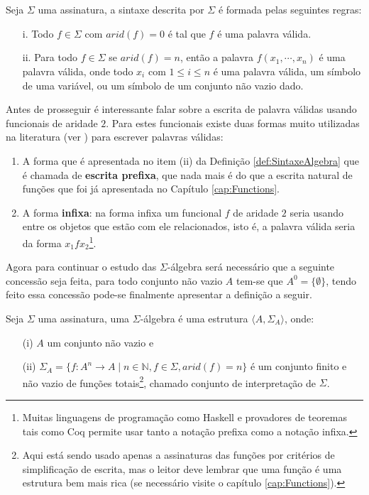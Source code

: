 \

\

\begin{definicao}\label{def:SintaxeAlgebra}
  Seja $\Sigma$ uma assinatura, a sintaxe descrita por $\Sigma$ é formada pelas seguintes regras: 
  \begin{itemize}
    \item[i.] Todo $f \in \Sigma$ com $arid(f) = 0$ é tal que $f$ é uma palavra válida.
    \item[ii.] Para todo $f \in \Sigma$ se $arid(f) = n$, então a palavra $f(x_1, \cdots, x_n)$ é uma palavra válida, onde todo $x_i$ com $1 \leq i \leq n$ é uma palavra válida, um símbolo de uma variável, ou um símbolo de um conjunto não vazio dado.
  \end{itemize}
\end{definicao}

Antes de prosseguir é interessante falar sobre a escrita de palavra válidas usando funcionais de aridade $2$. Para estes funcionais existe duas formas muito utilizadas na literatura (ver \cite{klaus2001, stanley1981}) para escrever palavras válidas: 

\begin{enumerate}
  \item A forma que é apresentada no item (ii) da Definição \ref{def:SintaxeAlgebra} que é chamada de \textbf{escrita prefixa}, que nada mais é do que a escrita natural de funções que foi já apresentada no Capítulo \ref{cap:Functions}. 
  \item A forma \textbf{infixa}: na forma infixa um funcional $f$ de aridade $2$ seria usando entre os objetos que estão com ele relacionados, isto é, a palavra válida seria da forma $x_1 f x_2$\footnote{Muitas linguagens de programação como Haskell \cite{learnHaskell2011, beginningHaskell} e provadores de teoremas tais como Coq \cite{coq2013} permite usar tanto a notação prefixa como a notação infixa.}.
\end{enumerate}

Agora para continuar o estudo das $\Sigma$-álgebra será necessário que a seguinte concessão seja feita, para todo conjunto não vazio $A$ tem-se que $A^0 = \{\emptyset\}$, tendo feito essa concessão pode-se finalmente apresentar a definição a seguir.

\begin{definicao}\label{def:SigmaAlgebra}
  Seja $\Sigma$ uma assinatura, uma $\Sigma$-álgebra é uma estrutura $\langle A, \Sigma_A \rangle$, onde:
  \begin{itemize}
    \item[(i)] $A$ um conjunto não vazio e 
    \item[(ii)] $\Sigma_A = \{f: A^n \rightarrow A  \mid n \in \mathbb{N}, f \in \Sigma, arid(f) = n\}$ é um conjunto finito e não vazio de funções totais\footnote{Aqui está sendo usado apenas a assinaturas das funções por critérios de simplificação de escrita, mas o leitor deve lembrar que uma função é uma estrutura bem mais rica (se necessário visite o capítulo \ref{cap:Functions}).}, chamado conjunto de interpretação de $\Sigma$.
  \end{itemize}
\end{definicao}

